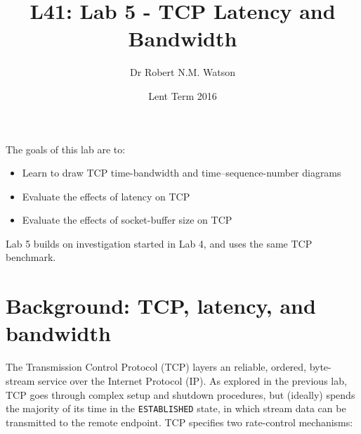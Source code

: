 \documentclass[a4paper,10pt]{article}
\begin{document}
\title{L41: Lab 5 - TCP Latency and Bandwidth}
\author{Dr Robert N.M. Watson}
\date{Lent Term 2016}
\maketitle

\noindent
The goals of this lab are to:

\begin{itemize}
\item Learn to draw TCP time-bandwidth and time--sequence-number diagrams
\item Evaluate the effects of latency on TCP
\item Evaluate the effects of socket-buffer size on TCP
\end{itemize}

\noindent
Lab 5 builds on investigation started in Lab 4, and uses the same TCP
benchmark.

\section*{Background: TCP, latency, and bandwidth}

The Transmission Control Protocol (TCP) layers an reliable, ordered,
byte-stream service over the Internet Protocol (IP).
As explored in the previous lab, TCP goes through complex setup and shutdown
procedures, but (ideally) spends the majority of its time in the
\texttt{ESTABLISHED} state, in which stream data can be transmitted to the
remote endpoint.
TCP specifies two rate-control mechanisms:
\end{document}

